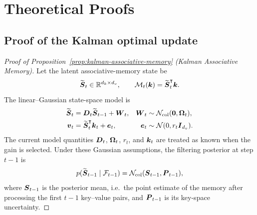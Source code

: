 \documentclass[11pt,letterpaper,logo]{yalearxiv}
\begin{document}
\section{Theoretical Proofs}
\label{app:proofs}

\subsection{Proof of the Kalman optimal update}
\label{app:proof-kalman-optimal-update}

\begin{proof}[Proof of Proposition~\ref{prop:kalman-associative-memory} (Kalman Associative Memory)]

Let the latent associative-memory state be
\[
  \widetilde{\boldsymbol{S}}_t \in \mathbb{R}^{d_k\times d_v},
  \qquad
  \mathcal{M}_t(\boldsymbol{k})=\widetilde{\boldsymbol{S}}_t^{\intercal}\boldsymbol{k}.
\]
The linear--Gaussian state-space model is
\begin{align}
  \widetilde{\boldsymbol{S}}_t
  &= \boldsymbol{D}_t\widetilde{\boldsymbol{S}}_{t-1}+\boldsymbol{W}_t,
  &
  \boldsymbol{W}_t&\sim\mathcal N_{\mathrm{col}}(\boldsymbol{0},\boldsymbol{\Omega}_t), \\
  \boldsymbol{v}_t
  &= \widetilde{\boldsymbol{S}}_t^{\intercal}\boldsymbol{k}_t+\boldsymbol{e}_t,
  &
  \boldsymbol{e}_t&\sim\mathcal{N}(0,r_t\boldsymbol{I}_{d_v}).
\end{align}
The current model quantities $\boldsymbol{D}_t$, $\boldsymbol{\Omega}_t$, $r_t$, and $\boldsymbol{k}_t$ are treated as
known when the gain is selected.
Under these Gaussian assumptions, the filtering posterior at step $t-1$ is
\begin{equation}
  p(\widetilde{\boldsymbol{S}}_{t-1}\mid \mathcal F_{t-1})
  =
  \mathcal N_{\mathrm{col}}(\boldsymbol{S}_{t-1},\boldsymbol{P}_{t-1}),
  \label{eq:previous-filtering-posterior}
\end{equation}
where $\boldsymbol{S}_{t-1}$ is the posterior mean, i.e.\ the point estimate of the memory after
processing the first $t-1$ key--value pairs, and $\boldsymbol{P}_{t-1}$ is its key-space uncertainty.


\end{proof}
\end{document}
